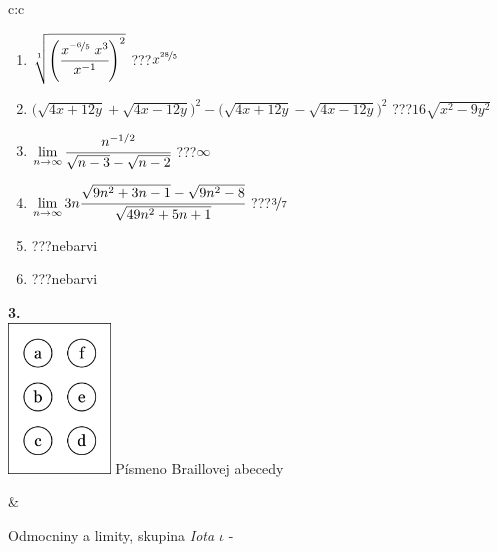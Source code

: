 \documentclass[10pt]{report}
\begin{document}
\begin{tabular}{c:c}
\begin{minipage}[c][104.5mm][t]{0.5\linewidth}
\begin{center}
\begin{minipage}{0.79\linewidth}
\begin{center}
\begin{varwidth}{\linewidth}
\begin{enumerate}
\small
\item $\sqrt[1]{\left(\cfrac{x^{\nicefrac{-6}{5}}\;x^{3}}{x^{-1}}\right)^{2}}$\quad \dotfill\; ???\;\dotfill \quad $x^{\nicefrac{28}{5}}$
\item {\footnotesize{\scriptsize$\big(\sqrt{4x+12y}+\sqrt{4x-12y}\big)^2-\big(\sqrt{4x+12y}-\sqrt{4x-12y}\big)^2$}\quad \dotfill\; ???\;\dotfill \quad $16\sqrt{x^2-9y^2}$}
\item $\lim\limits_{n\to\infty}\cfrac{n^{-1/2}}{\sqrt{n-3}-\sqrt{n-2}}$\quad \dotfill\; ???\;\dotfill \quad $\infty$
\item $\lim\limits_{n\to\infty}3n\cfrac{\sqrt{9n^2+3n-1}-\sqrt{9n^2-8}}{\sqrt{49n^2+5n+1}}$\quad \dotfill\; ???\;\dotfill \quad $\nicefrac{3}{7}$
\item \quad \dotfill\; ???\;\dotfill \quad nebarvi
\item \quad \dotfill\; ???\;\dotfill \quad nebarvi
\end{enumerate}
\end{varwidth}
\end{center}
\end{minipage}
\begin{minipage}{0.20\linewidth}
\begin{center}
{\Huge\bfseries 3.} \\[2mm]
\includegraphics[height=40mm]{../images/braille.png}
{\small Písmeno Braillovej abecedy}
\end{center}
\end{minipage}
\end{center}
\end{minipage}
&
\begin{minipage}[c][104.5mm][t]{0.5\linewidth}
\begin{center}
\vspace{7mm}
{\huge Odmocniny a limity, skupina \textit{Iota $\iota$} -}\\[5mm]

\end{center}
\end{minipage}
\end{tabular}
\end{document}
